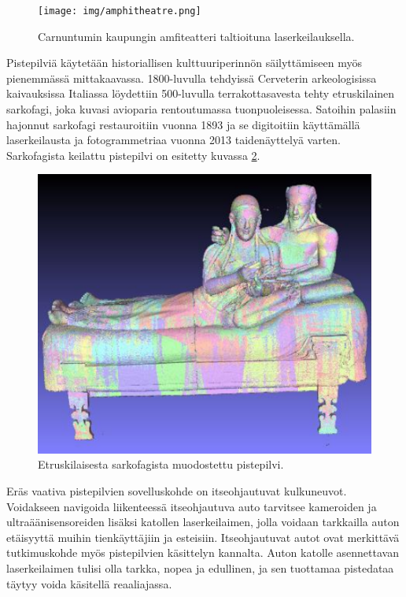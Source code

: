 \begin{figure}
    \centering
    \texttt{[image: img/amphitheatre.png]}
    \caption{Carnuntumin kaupungin amfiteatteri taltioituna laserkeilauksella. \cite{Amphitheatre}}
    \label{amfi}
\end{figure}

Pistepilviä käytetään historiallisen kulttuuriperinnön säilyttämiseen myös pienemmässä mittakaavassa. 1800-luvulla tehdyissä Cerveterin arkeologisissa kaivauksissa Italiassa löydettiin 500-luvulla terrakottasavesta tehty etruskilainen sarkofagi, joka kuvasi avioparia rentoutumassa tuonpuoleisessa. Satoihin palasiin hajonnut sarkofagi restauroitiin vuonna 1893 ja se digitoitiin käyttämällä laserkeilausta ja fotogrammetriaa vuonna 2013 taidenäyttelyä varten. Sarkofagista keilattu pistepilvi on esitetty kuvassa \ref{sarko}. \cite{sarkofagi} 

\begin{figure}
    \centering
    \includegraphics[width=0.4\paperwidth]{img/sarkofagi.png}
    \caption{Etruskilaisesta sarkofagista muodostettu pistepilvi. \cite{sarkofagi}}
    \label{sarko}
\end{figure}

Eräs vaativa pistepilvien sovelluskohde on itseohjautuvat kulkuneuvot. Voidakseen navigoida liikenteessä itseohjautuva auto tarvitsee kameroiden ja ultraäänisensoreiden lisäksi katollen laserkeilaimen, jolla voidaan tarkkailla auton etäisyyttä muihin tienkäyttäjiin ja esteisiin. Itseohjautuvat autot ovat merkittävä tutkimuskohde myös pistepilvien käsittelyn kannalta. Auton katolle asennettavan laserkeilaimen tulisi olla tarkka, nopea ja edullinen, ja sen tuottamaa pistedataa täytyy voida käsitellä reaaliajassa. \cite{car} 

